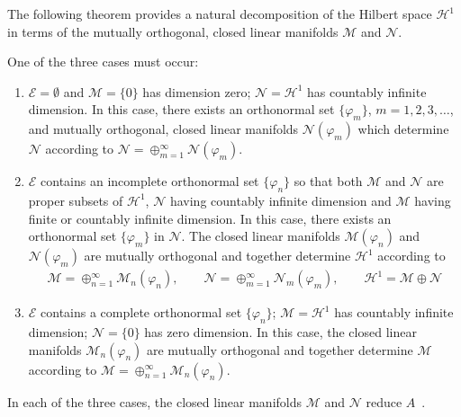 \documentclass[leqno,onefignum,onetabnum]{siamltex1213}
\newcommand{\Ec}{\mathcal{E}}
\newcommand{\Mc}{\mathcal{M}}
\newcommand{\Nc}{\mathcal{N}}
\newcommand{\Hs}{\mathscr{H}}
\begin{document}
The following theorem provides a natural decomposition of the Hilbert
space $\Hs^1$ in terms of the mutually orthogonal, closed linear manifolds
$\Mc$ and $\Nc$.
%
\begin{theorem}
\label{thm:Hilbert_Eig_Decomp}  
One of the three cases must occur:
%
\begin{enumerate}
\item $\Ec=\emptyset$ and $\Mc=\{0\}$ has dimension zero; $\Nc=\Hs^1$
has countably infinite dimension. In this case, there exists an
orthonormal set $\{\varphi_m\}$, $m=1,2,3,\ldots$, and mutually orthogonal, closed
linear manifolds $\Nc(\varphi_m)$ which determine $\Nc$ according to
$\Nc=\oplus_{m=1}^\infty\Nc(\varphi_m)$.    
\item $\Ec$ contains an incomplete orthonormal set $\{\varphi_n\}$ so that
both $\Mc$ and $\Nc$ are proper subsets of $\Hs^1$, $\Nc$ having
countably infinite dimension and $\Mc$ having finite or countably
infinite dimension. In this case, there exists an orthonormal set
$\{\varphi_m\}$ in $\Nc$. The closed linear manifolds $\Mc(\varphi_n)$ and
$\Nc(\varphi_m)$ are mutually orthogonal and together determine $\Hs^1$
according to   
%
\begin{align*}
  \Mc=\oplus_{n=1}^\infty\Mc_n(\varphi_n), \qquad
  \Nc=\oplus_{m=1}^\infty\Nc_m(\varphi_m), \qquad
  \Hs^1=\Mc\oplus\Nc
\end{align*}
%
\item $\Ec$ contains a complete orthonormal set $\{\varphi_n\}$; $\Mc=\Hs^1$
has countably infinite dimension; $\Nc=\{0\}$ has zero dimension. In
this case, the closed linear manifolds $\Mc_n(\varphi_n)$ are mutually
orthogonal and together determine $\Mc$ according 
to $\Mc=\oplus_{n=1}^\infty\Mc_n(\varphi_n)$.     
\end{enumerate}
%
In each of the three cases, the closed linear manifolds $\Mc$ and
$\Nc$ reduce $A$~\cite{Stone:64}.
\end{theorem}
\end{document}
